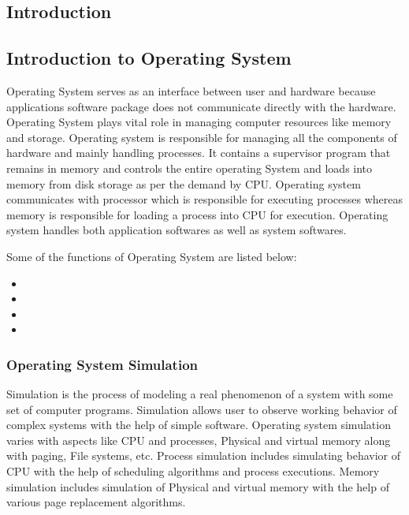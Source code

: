 \begin{onehalfspacing}
\chapter{Introduction}
\section{Introduction to Operating System} 
Operating System serves as an interface between user and hardware because applications software package does not communicate directly with the hardware. Operating System plays vital role in 
managing computer resources like memory and storage. Operating system is responsible for managing all the components of hardware and mainly handling processes. It contains a supervisor program that remains in memory and controls the entire operating System and loads into memory from disk storage as per the demand by CPU. Operating system communicates with processor which is responsible for executing processes whereas memory is responsible for loading a process into CPU for execution. Operating system handles both application softwares as well as system softwares.\newline

\par Some of the functions of Operating System are listed below:
\begin{itemize}
    \item {}
    \item {}
    \item {}
    \item {}
\end{itemize} 

\subsection{Operating System Simulation}
Simulation is the process of modeling a real phenomenon of a system with some set of computer programs. Simulation allows user to observe working behavior of complex systems with the help of simple software. Operating system simulation varies with aspects like CPU and processes, Physical and virtual memory along with paging, File systems, etc. Process simulation includes simulating behavior of CPU with the help of scheduling algorithms and process executions. Memory simulation includes simulation of Physical and virtual memory with the help of various page replacement algorithms.


\end{onehalfspacing}
